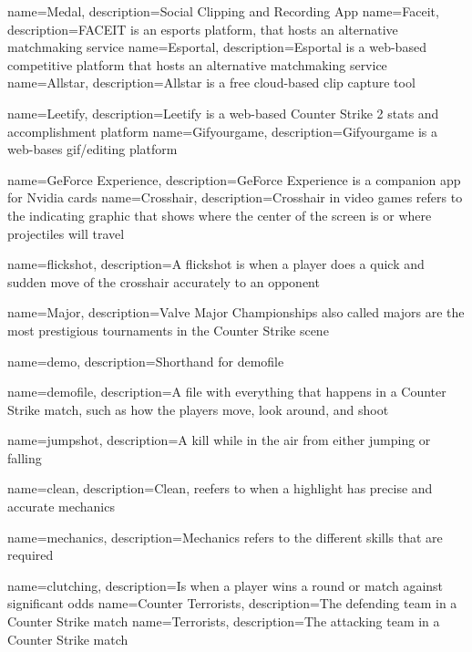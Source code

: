 {
    name=Medal,
    description={Social Clipping and Recording App}
}
{
    name=Faceit,
    description={FACEIT is an esports platform, that hosts an alternative matchmaking service}
}
{
    name=Esportal,
    description={Esportal is a web-based competitive platform that hosts an alternative matchmaking service }
}
{
    name=Allstar,
    description={Allstar is a free cloud-based clip capture tool}
}

{
    name=Leetify,
    description={Leetify is a web-based Counter Strike 2 stats and accomplishment platform}
}
{
    name=Gifyourgame,
    description={Gifyourgame is a web-bases gif/editing platform}
}

{
    name=GeForce Experience,
    description={GeForce Experience is a companion app for Nvidia cards}
}
{
    name=Crosshair,
    description={Crosshair in video games refers to the indicating graphic that shows where the center of the screen is or where projectiles will travel}
}

{
    name=flickshot,
    description={A flickshot is when a player does a quick and sudden move of the crosshair accurately to an opponent}
}

{
    name=Major,
    description={Valve Major Championships also called majors are the most prestigious tournaments in the Counter Strike scene}
}

{
    name=demo,
    description={Shorthand for \Gls{demofile}}
}

{
    name=demofile,
    description={A file with everything that happens in a Counter Strike match, such as how the players move, look around, and shoot}
}

{
name=jumpshot,
description={A kill while in the air from either jumping or falling}
}

{
    name=clean,
    description={Clean, reefers to when a highlight has precise and accurate \Gls{mechanics} }
}

{
    name=mechanics,
    description={Mechanics refers to the different skills that are required }
}

{
    name=clutching,
    description={Is when a player wins a round or match against significant odds}
}
{
    name=Counter Terrorists,
    description={The defending team in a Counter Strike match}
}
{
    name=Terrorists,
    description={The attacking team in a Counter Strike match}
}

